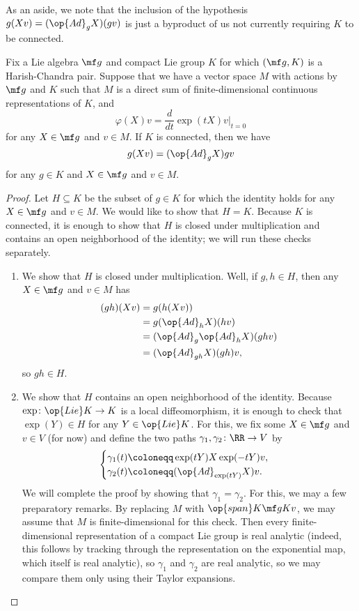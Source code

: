 \documentclass[../notes.tex]{subfiles}
\begin{document}
As an aside, we note that the inclusion of the hypothesis $g(Xv)=(\op{Ad}_gX)(gv)$ is just a byproduct of us not currently requiring $K$ to be connected.
\begin{lemma}
	Fix a Lie algebra $\mf g$ and compact Lie group $K$ for which $(\mf g,K)$ is a Harish-Chandra pair. Suppose that we have a vector space $M$ with actions by $\mf g$ and $K$ such that $M$ is a direct sum of finite-dimensional continuous representations of $K$, and
	\[\varphi(X)v=\frac d{dt}\exp(tX)v\bigg|_{t=0}\]
	for any $X\in\mf g$ and $v\in M$. If $K$ is connected, then we have
	\[g(Xv)=(\op{Ad}_gX)gv\]
	for any $g\in K$ and $X\in\mf g$ and $v\in M$.
\end{lemma}
\begin{proof}
	Let $H\subseteq K$ be the subset of $g\in K$ for which the identity holds for any $X\in\mf g$ and $v\in M$. We would like to show that $H=K$. Because $K$ is connected, it is enough to show that $H$ is closed under multiplication and contains an open neighborhood of the identity; we will run these checks separately.
	\begin{enumerate}
		\item We show that $H$ is closed under multiplication. Well, if $g,h\in H$, then any $X\in\mf g$ and $v\in M$ has
		\begin{align*}
			(gh)(Xv) &= g(h(Xv)) \\
			&= g(\op{Ad}_hX)(hv) \\
			&= (\op{Ad}_g\op{Ad}_hX)(ghv) \\
			&= (\op{Ad}_{gh}X)(gh)v,
		\end{align*}
		so $gh\in H$.

		\item We show that $H$ contains an open neighborhood of the identity. Because $\exp\colon\op{Lie}K\to K$ is a local diffeomorphism, it is enough to check that $\exp(Y)\in H$ for any $Y\in\op{Lie}K$. For this, we fix some $X\in\mf g$ and $v\in V$ (for now) and define the two paths $\gamma_1,\gamma_2\colon\RR\to V$ by
		\[\begin{cases}
			\gamma_1(t) \coloneqq \exp(tY)X\exp(-tY)v, \\
			\gamma_2(t) \coloneqq (\op{Ad}_{\exp(tY)}X)v.
		\end{cases}\]
		We will complete the proof by showing that $\gamma_1=\gamma_2$. For this, we may a few preparatory remarks. By replacing $M$ with $\op{span}K\mf gKv$, we may assume that $M$ is finite-dimensional for this check. Then every finite-dimensional representation of a compact Lie group is real analytic (indeed, this follows by tracking through the representation on the exponential map, which itself is real analytic), so $\gamma_1$ and $\gamma_2$ are real analytic, so we may compare them only using their Taylor expansions.


\end{enumerate}
\end{proof}
\end{document}
